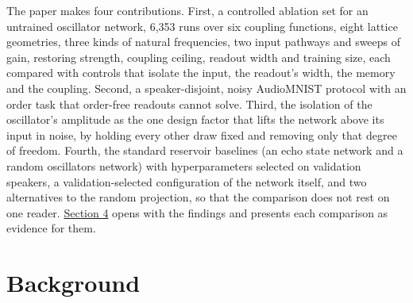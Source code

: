\documentclass{article}
\makeatletter
\newcommand{\iclr@floatbarrier}{\par\vspace{\z@}%
  \ifx\@deferlist\@empty\else\clearpage\fi}
\let\iclr@section\section
\renewcommand{\section}{\iclr@floatbarrier\iclr@section}
\makeatother
\begin{document}
The paper makes four contributions. First, a controlled ablation set for
an untrained oscillator network, 6,353 runs over six coupling functions,
eight lattice geometries, three kinds of natural frequencies, two input
pathways and sweeps of gain, restoring strength, coupling ceiling,
readout width and training size, each compared with controls that
isolate the input, the readout's width, the memory and the coupling.
Second, a speaker-disjoint, noisy AudioMNIST protocol with an order task
that order-free readouts cannot solve. Third, the isolation of the
oscillator's amplitude as the one design factor that lifts the network
above its input in noise, by holding every other draw fixed and removing
only that degree of freedom. Fourth, the standard reservoir baselines
(an echo state network and a random oscillators network) with
hyperparameters selected on validation speakers, a validation-selected
configuration of the network itself, and two alternatives to the random
projection, so that the comparison does not rest on one reader.
\hyperref[sec-4]{Section 4} opens with the findings and presents each
comparison as evidence for them.

\section{Background}\label{sec-2}
\end{document}
